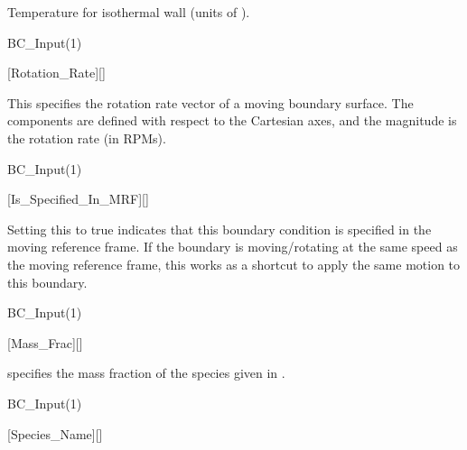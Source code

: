 \begin{nmldescbody}
Temperature for isothermal wall (units of \unitTemp{}).
\end{nmldescbody}


\begin{nmldescitem}
BC_Input(1)%
\end{nmldescitem}
[Rotation\_Rate][]

\begin{nmldescbody}
This specifies the rotation rate vector of a moving boundary surface.
%
The components are defined with respect to the Cartesian axes,
and the magnitude is the rotation rate (in RPMs).
\end{nmldescbody}


\begin{nmldescitem}
BC_Input(1)%
\end{nmldescitem}
[Is\_Specified\_In\_MRF][]

\begin{nmldescbody}
Setting this to true indicates that this boundary condition is specified in
the moving reference frame. If the boundary is moving\slash rotating at the
same speed as the moving reference frame, this works as a shortcut to apply
the same motion to this boundary.
\end{nmldescbody}


\begin{nmldescitem}
BC_Input(1)%
\end{nmldescitem}
[Mass\_Frac][]

\begin{nmldescbody}
\raggedright %
 specifies the mass fraction
of the species given in .
\end{nmldescbody}


\begin{nmldescitem}
BC_Input(1)%
\end{nmldescitem}
[Species\_Name][]

